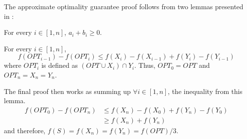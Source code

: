 \noindent The approximate optimality guarantee proof follows from two lemmas presented in \citealp{Buchbinder:2012:TLT:2417500.2417835}:
\begin{lemma}
\label{lem:ab}
 For every $i\in[1,n]$, $a_i+b_i\ge 0$.
\end{lemma}
\begin{lemma}
 For every $i\in[1,n]$, \[f(OPT_{i-1})-f(OPT_i)\le f(X_i)-f(X_{i-1})+f(Y_i)-f(Y_{i-1})\] where $OPT_i$ is defined as $(OPT\cup X_i)\cap Y_i$. Thus, $OPT_0=OPT$ and $OPT_n=X_n=Y_n$.
\end{lemma}
\noindent The final proof then works as summing up $\forall i\in[1,n]$, the inequality from this lemma.
\begin{align}
 f(OPT_0)-f(OPT_n)&\le f(X_n)-f(X_0)+f(Y_n)-f(Y_0)\\
       &\ge f(X_n)+f(Y_n)
\end{align}
\noindent and therefore, $f(S)=f(X_n)=f(Y_n)=f(OPT)/3$.

